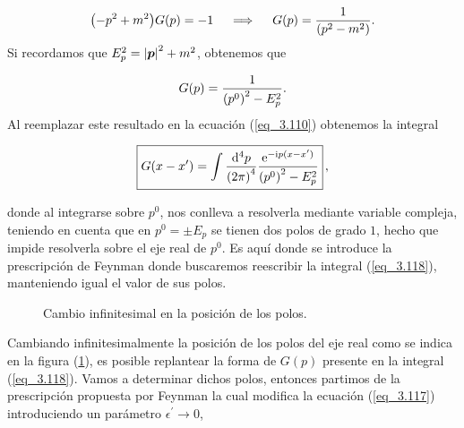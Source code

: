 \begin{equation}
    \qty(-p^2+ m^2)G(p) = -1 \quad \implies \quad G(p) = \frac{1}{\qty(p^2 - m^2)}.
\end{equation}
Si recordamos que $E_p^2=\abs{\vb*{p}}^2+m^2$, obtenemos que 

\begin{equation}
    G(p) = \frac{1}{\qty(p^0)^2-E_p^2}.
    \label{eq_3.117}
\end{equation}
Al reemplazar este resultado en la ecuación (\ref{eq_3.110}) obtenemos la integral

\begin{equation}
	\boxed{
     G(x-x^\prime) = \int \frac{\dd[4]{p}}{\qty(2\pi)^4} \frac{ \mathrm{e}^{-\mathrm{i} p(x-x^\prime)}}{\qty(p^0)^2-E_p^2}
    }\, ,
     \label{eq_3.118}
\end{equation}

donde al integrarse sobre $p^0$, nos conlleva a resolverla mediante variable compleja, teniendo en cuenta que en $p^0 = \pm E_p$ se tienen dos polos de grado $1$, hecho que impide resolverla sobre el eje real de $p^0$. Es aquí donde se introduce la prescripción de Feynman donde buscaremos reescribir la integral (\ref{eq_3.118}), manteniendo igual el valor de sus polos.\\

    \begin{figure}[H]
    \centering
    \caption{Cambio infinitesimal en la posición de los polos.}
    \label{fig_3.1}
\end{figure}

Cambiando infinitesimalmente la posición de los polos del eje real como se indica en la figura (\ref{fig_3.1}), es posible replantear la forma de $G(p)$ presente en la integral (\ref{eq_3.118}). Vamos a determinar dichos polos, entonces partimos de la prescripción propuesta por Feynman la cual modifica la ecuación (\ref{eq_3.117}) introduciendo un parámetro $\epsilon^\prime \to 0$,

